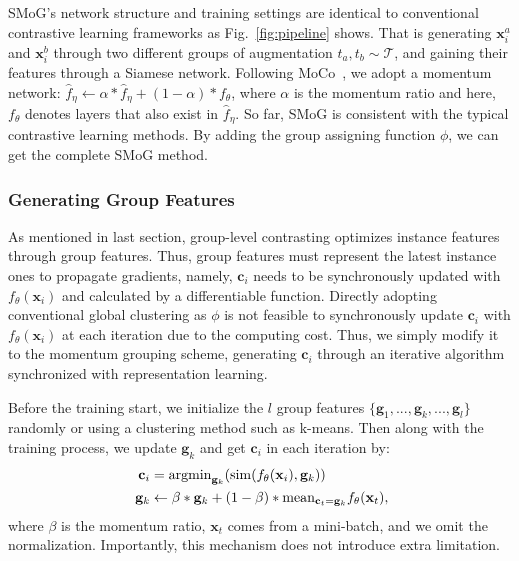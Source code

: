 \documentclass[runningheads]{style/llncs}
\begin{document}
SMoG's network structure and training settings are identical to conventional contrastive learning frameworks as Fig.~\ref{fig:pipeline} shows. That is generating $\mathbf{x}_i^a$ and $\mathbf{x}_i^b$ through two different groups of augmentation $t_a, t_b \sim \mathcal{T}$, and gaining their features through a Siamese network. Following MoCo~\cite{moco}, we adopt a momentum network: $\hat f_\eta \gets \alpha*\hat f_\eta + (1- \alpha) * f_\theta$, where $\alpha$ is the momentum ratio and here, $f_\theta$ denotes layers that also exist in $\hat f_\eta$. So far, SMoG is consistent with the typical contrastive learning methods. By adding the group assigning function $\phi$, we can get the complete SMoG method.

\subsubsection{Generating Group Features}
As mentioned in last section, group-level contrasting optimizes instance features through group features. Thus, group features must represent the latest instance ones to propagate gradients, namely, $\mathbf{c}_i$ needs to be synchronously updated with $f_\theta(\mathbf{x}_i)$ and calculated by a differentiable function. Directly adopting conventional global clustering as $\phi$ is not feasible to synchronously update $\mathbf{c}_i$ with $f_\theta(\mathbf{x}_i)$ at each iteration due to the computing cost. Thus, we simply modify it to the momentum grouping scheme, generating $\mathbf{c}_i$ through an iterative algorithm synchronized with representation learning.

Before the training start, we initialize the $l$ group features $\{\mathbf{g}_1, ..., \mathbf{g}_k, ..., \mathbf{g}_l\}$ randomly or using a clustering method such as k-means. Then along with the training process, we update $\mathbf{g}_k$ and get $\mathbf{c}_i$ in each iteration by:
\begin{equation}~\label{eq:mg}
\begin{aligned}
\mathbf{c}_i &= {\rm argmin}_{\mathbf{g}_k}({\rm sim}(f_\theta(\mathbf{x}_i), \mathbf{g}_k))\\
\mathbf{g}_k &\gets \beta * \mathbf{g}_k + (1 - \beta) * {\rm mean}_{\mathbf{c}_t=\mathbf{g}_k}{f_\theta(\mathbf{x}_t)},
\end{aligned}
\end{equation}
where $\beta$ is the momentum ratio, $\mathbf{x}_t$ comes from a mini-batch, and we omit the normalization. Importantly, this mechanism does not introduce extra limitation.
\end{document}
